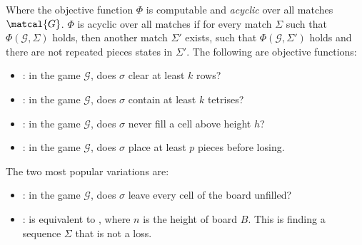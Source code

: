 Where the objective function $\Phi$ is computable and \emph{acyclic} over all matches $\matcal{G}$. $\Phi$ is acyclic over all matches if for every match $\Sigma$ such that $\Phi(\mathcal{G}, \Sigma)$ holds, then another match $\Sigma'$ exists, such that  $\Phi(\mathcal{G},\Sigma')$ holds and there are not repeated pieces states in $\Sigma'$. The following are objective functions:

\begin{itemize}
  \item {}: in the game $\mathcal{G}$, does $\sigma$ clear at least $k$ rows?
  \item {}: in the game $\mathcal{G}$, does $\sigma$ contain at least $k$ tetrises?
  \item {}: in the game $\mathcal{G}$, does $\sigma$ never fill a cell above height $h$?
  \item {}: in the game $\mathcal{G}$, does $\sigma$ place at least $p$ pieces before losing.
\end{itemize} 

The two most popular variations are:

\begin{itemize} \index{\clearing} \index{\survival}
  \item \clearing: in the game $\mathcal{G}$, does $\sigma$ leave every cell of the board unfilled?
  \item \survival: is equivalent to , where $n$ is the height of board $B$. This is finding a sequence $\Sigma$ that is not a loss.
\end{itemize}

